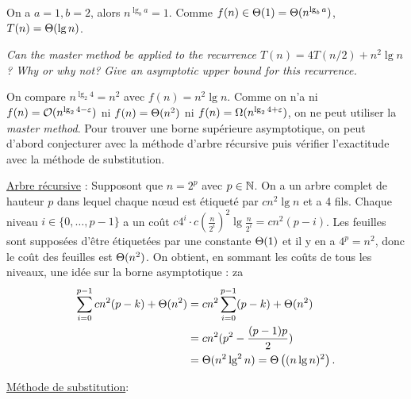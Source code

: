 \begin{description}
    \begin{ex}
       On a $a=1, b=2$, alors $n^{\lg_b a} = 1$. Comme $f(n) \in \Theta(1) = \Theta(n^{\lg_b a})$, $T(n) = \Theta(\lg n)$.
    \end{ex}
  
   {\itshape Can the master method be applied to the recurrence $T(n) = 4T(n/2) + n^2\lg n$ ? Why or why not? Give an asymptotic upper bound for this recurrence.}
    \begin{exrev} %
      On compare $n^{\lg_2 4} = n^2$ avec $f(n) = n^2\lg n$. Comme on n'a ni $f(n) = \mathcal{O}(n^{\lg_2 4 - \varepsilon})$ ni $f(n) = \Theta(n^2)$  ni $f(n) = \Omega(n^{\lg_2 4 + \varepsilon})$, on ne peut utiliser la {\itshape master method}. Pour trouver une borne sup\'erieure asymptotique, on peut d'abord conjecturer avec la m\'ethode d'arbre r\'ecursive puis v\'erifier l'exactitude avec la m\'ethode de substitution.

      \ul{Arbre r\'ecursive} : Supposont que $n = 2^p$ avec $p \in \mathbb{N}$. On a un arbre complet de hauteur $p$ dans lequel chaque n\oe ud est \'etiquet\'e par $cn^2\lg n$ et a 4 fils. Chaque niveau $i \in \{0, \ldots, p - 1\}$ a un co\^ut $c4^i\cdot c(\frac{n}{2^i})^2\lg \frac{n}{2^i} = cn^2(p - i)$. Les feuilles sont suppos\'ees d'\^etre \'etiquet\'ees par une constante $\Theta(1)$ et il y en a $4^p = n^2$, donc le co\^ut des feuilles est $\Theta(n^2)$. On obtient, en sommant les co\^uts de tous les niveaux, une id\'ee sur la borne asymptotique :
      za\begin{align*}
        \sum_{i=0}^{p-1}cn^2(p-k)+ \Theta(n^2) &= cn^2\sum_{i=0}^{p-1}(p-k) + \Theta(n^2)\\
        &= cn^2(p^2 - \frac{(p-1)p}{2})\\
        &= \Theta(n^2\lg^2 n) = \Theta\left( (n\lg n)^2 \right).
      \end{align*}

    \ul{M\'ethode de substitution}:
    \end{exrev}
  

\end{description}

